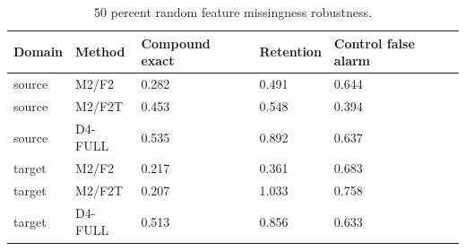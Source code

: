 \begin{table}[t]
\centering
\small
\caption{50 percent random feature missingness robustness.}
\begin{tabular}{lllll}
\hline
Domain & Method & Compound exact & Retention & Control false alarm \\
\hline
source & M2/F2 & 0.282 & 0.491 & 0.644 \\
source & M2/F2T & 0.453 & 0.548 & 0.394 \\
source & D4-FULL & 0.535 & 0.892 & 0.637 \\
target & M2/F2 & 0.217 & 0.361 & 0.683 \\
target & M2/F2T & 0.207 & 1.033 & 0.758 \\
target & D4-FULL & 0.513 & 0.856 & 0.633 \\
\hline
\end{tabular}
\end{table}
